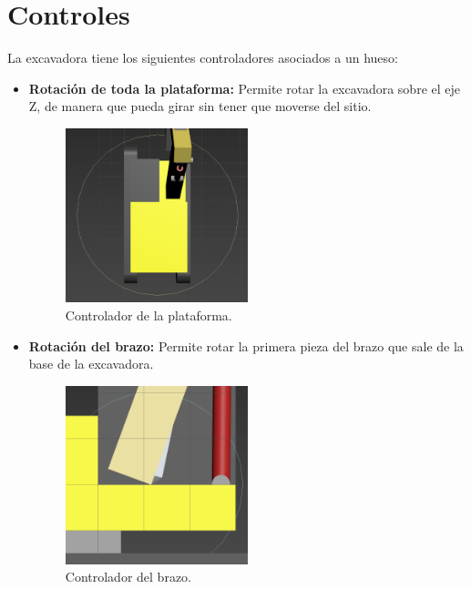 \section{Controles}

La excavadora tiene los siguientes controladores asociados a un hueso:

\begin{itemize}
    \item \textbf{Rotación de toda la plataforma: }Permite rotar la excavadora sobre el eje Z, de manera que pueda girar sin tener que moverse del sitio.
    
    \begin{figure}[H]
        \centering
        \includegraphics[width=0.5\textwidth]{imagenes/controlplat.png}
        \caption{Controlador de la plataforma.}
     \end{figure}

     \newpage

    \item \textbf{Rotación del brazo: }Permite rotar la primera pieza del brazo que sale de la base de la excavadora.
    
    \begin{figure}[H]
        \centering
        \includegraphics[width=0.5\textwidth]{imagenes/brazo1control.png}
        \caption{Controlador del brazo.}
     \end{figure}    


\end{itemize}
